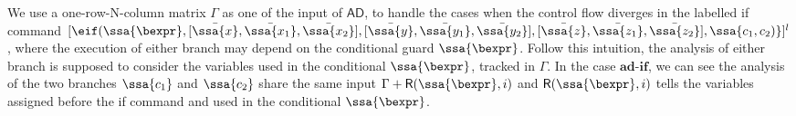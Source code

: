  We use a one-row-N-column matrix $\Gamma$ as one of the input of $\mathsf{AD}$, to handle the cases when the control flow diverges in the labelled if command $[\eif(\ssa{\bexpr},[ \bar{\ssa{x}}, \bar{\ssa{x_1}}, \bar{\ssa{x_2}}] ,[ \bar{\ssa{y}}, \bar{\ssa{y_1}}, \bar{\ssa{y_2}}] , [ \bar{\ssa{z}}, \bar{\ssa{z_1}}, \bar{\ssa{z_2}}] , \ssa{ c_1, c_2)}]^{l} $, where the execution of either branch may depend on the conditional guard $\ssa{\bexpr}$. Follow this intuition, the analysis of either branch is supposed to consider the variables used in the conditional $\ssa{\bexpr}$, tracked in $\Gamma$. In the case $\textbf{ad-if}$, we can see the analysis of the two branches $\ssa{c_1}$ and $\ssa{c_2}$ share the same input $\Gamma + \mathsf{R}(\ssa{\bexpr}, i)$ and $\mathsf{R}(\ssa{\bexpr}, i) $ tells the variables assigned before the if command and used in the conditional $\ssa{\bexpr}$.   

